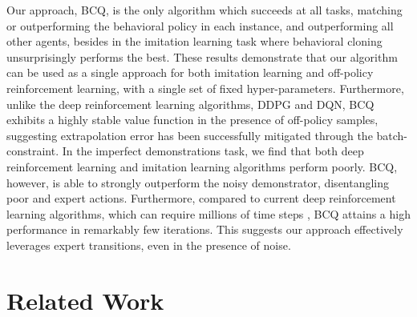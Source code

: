 \documentclass{article}
\begin{document}
Our approach, BCQ, is the only algorithm which succeeds at all tasks, matching or outperforming the behavioral policy in each instance, and outperforming all other agents, besides in the imitation learning task where behavioral cloning unsurprisingly performs the best.
These results demonstrate that our algorithm can be used as a single approach for both imitation learning and off-policy reinforcement learning, with a single set of fixed hyper-parameters. 
Furthermore, unlike the deep reinforcement learning algorithms, DDPG and DQN, BCQ exhibits a highly stable value function in the presence of off-policy samples, suggesting extrapolation error has been successfully mitigated through the batch-constraint.  
In the imperfect demonstrations task, we find that both deep reinforcement learning and imitation learning algorithms perform poorly. BCQ, however, is able to strongly outperform the noisy demonstrator, disentangling poor and expert actions. Furthermore, compared to current deep reinforcement learning algorithms, which can require millions of time steps \cite{duan2016benchmark, hendersonRL2017}, BCQ attains a high performance in remarkably few iterations. This suggests our approach effectively leverages expert transitions, even in the presence of noise. 


\section{Related Work}
\end{document}
